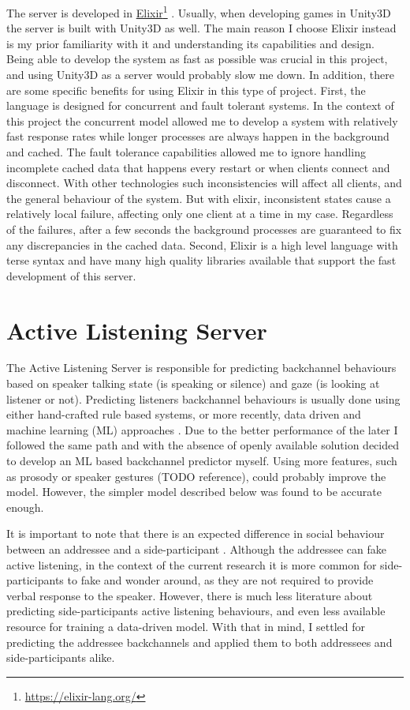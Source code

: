 \documentclass[]{simple-thesis}
\newcommand\fnurl[2]{%
  \href{#2}{#1}\footnote{\url{#2}}%
}
\begin{document}
The server is developed in \fnurl{Elixir}{https://elixir-lang.org/}.
Usually, when developing games in Unity3D the server is built with Unity3D as well.
The main reason I choose Elixir instead is my prior familiarity with it and understanding its capabilities and design.
Being able to develop the system as fast as possible was crucial in this project, and using Unity3D as a server would probably slow me down.
In addition, there are some specific benefits for using Elixir in this type of project.
First, the language is designed for concurrent and fault tolerant systems.
In the context of this project the concurrent model allowed me to develop a system with relatively fast response rates while longer processes are always happen in the background and cached.
The fault tolerance capabilities allowed me to ignore handling incomplete cached data that happens every restart or when clients connect and disconnect.
With other technologies such inconsistencies will affect all clients, and the general behaviour of the system.
But with elixir, inconsistent states cause a relatively local failure, affecting only one client at a time in my case.
Regardless of the failures, after a few seconds the background processes are guaranteed to fix any discrepancies in the cached data.
Second, Elixir is a high level language with terse syntax and have many high quality libraries available that support the fast development of this server.

\section{Active Listening Server}\label{system:active_listening_server}

The Active Listening Server is responsible for predicting backchannel behaviours based on speaker talking state (is speaking or silence) and gaze (is looking at listener or not).
Predicting listeners backchannel behaviours is usually done using either hand-crafted rule based systems, or more recently, data driven and machine learning (ML) approaches \citep{Morency2008}.
Due to the better performance of the later I followed the same path and with the absence of openly available solution decided to develop an ML based backchannel predictor myself.
Using more features, such as prosody \citep{Ward2000} or speaker gestures (TODO reference), could probably improve the model.
However, the simpler model described below was found to be accurate enough.

It is important to note that there is an expected difference in social behaviour between an addressee and a side-participant \citep{Clark1982}.
Although the addressee can fake active listening, in the context of the current research it is more common for side-participants to fake and wonder around, as they are not required to provide verbal response to the speaker.
However, there is much less literature about predicting side-participants active listening behaviours, and even less available resource for training a data-driven model.
With that in mind, I settled for predicting the addressee backchannels and applied them to both addressees and side-participants alike.
\end{document}
